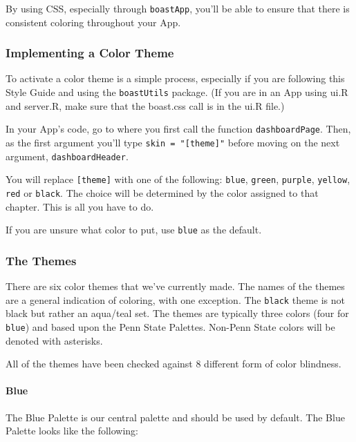 \documentclass[]{book}
\let\oldparagraph\paragraph
\renewcommand{\paragraph}[1]{\oldparagraph{#1}\mbox{}}
\begin{document}
By using CSS, especially through \texttt{boastApp}, you'll be able to ensure that there is consistent coloring throughout your App.

\hypertarget{implementing-a-color-theme}{%
\subsubsection{Implementing a Color Theme}\label{implementing-a-color-theme}}

To activate a color theme is a simple process, especially if you are following this Style Guide and using the \texttt{boastUtils} package. (If you are in an App using ui.R and server.R, make sure that the boast.css call is in the ui.R file.)

In your App's code, go to where you first call the function \texttt{dashboardPage}. Then, as the first argument you'll type \texttt{skin\ =\ "{[}theme{]}"} before moving on the next argument, \texttt{dashboardHeader}.

You will replace \texttt{{[}theme{]}} with one of the following: \texttt{blue}, \texttt{green}, \texttt{purple}, \texttt{yellow}, \texttt{red} or \texttt{black}. The choice will be determined by the color assigned to that chapter. This is all you have to do.

If you are unsure what color to put, use \texttt{blue} as the default.

\hypertarget{the-themes}{%
\subsubsection{The Themes}\label{the-themes}}

There are six color themes that we've currently made. The names of the themes are a general indication of coloring, with one exception. The \texttt{black} theme is not black but rather an aqua/teal set. The themes are typically three colors (four for \texttt{blue}) and based upon the Penn State Palettes. Non-Penn State colors will be denoted with asterisks.

All of the themes have been checked against 8 different form of color blindness.

\hypertarget{blue}{%
\paragraph{Blue}\label{blue}}

The Blue Palette is our central palette and should be used by default. The Blue Palette looks like the following:
\end{document}
